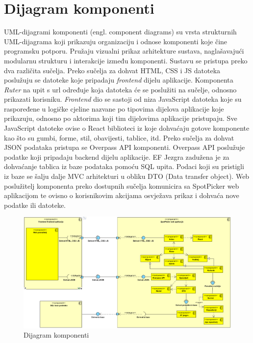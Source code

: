 \eject 


\section{Dijagram komponenti}

UML-dijagrami komponenti (engl. component diagrams) su vrsta strukturnih UML-dijagrama koji
prikazuju organizaciju i odnose komponenti koje čine programsku potporu. Pružaju vizualni prikaz 
arhitekture sustava, naglašavajući modularnu strukturu i interakcije između komponenti. Sustavu se pristupa preko
dva različita sučelja. Preko sučelja za dohvat HTML, CSS i JS datoteka poslužuju se 
datoteke koje pripadaju \textit{frontend} dijelu aplikacije. Komponenta \textit{Ruter} na
upit s url određuje koja datoteka će se poslužiti na sučelje, odnosno prikazati korisniku. \textit{Frontend} dio se sastoji od niza JavaScript datoteka koje su raspoređene u logičke cjeline nazvane po tipovima dijelova aplikacije koje prikazuju, odnosno po aktorima koji tim dijelovima aplikacije pristupaju. Sve JavaScript datoteke ovise o React biblioteci iz
koje dohvaćaju gotove komponente kao što su gumbi, forme, stil, obavijesti, tablice, itd. Preko sučelja za dohvat JSON podataka pristupa se Overpass API komponenti. Overpass API poslužuje 
podatke koji pripadaju backend dijelu aplikacije. EF Jezgra zadužena je za dohvaćanje tablica iz baze podataka pomoću SQL upita. Podaci koji su pristigli iz baze se šalju dalje MVC arhitekturi u obliku DTO (Data transfer object).  Web poslužitelj komponenta preko dostupnih sučelja komunicira sa SpotPicker web aplikacijom te ovisno o korisnikovim akcijama osvježava prikaz i dohvaća nove podatke ili datoteke.

\vspace{10cm}

\begin{figure}[H]
	\includegraphics[width=\textwidth]{slike/dijagram_komponenti.png} %
	\centering
	\caption{Dijagram komponenti}
	\label{fig:dijagramaktivnosti}
\end{figure}


\eject 

